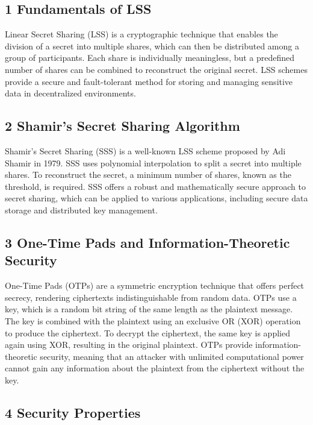 \documentclass[11pt]{article}
\begin{document}
\subsection{1 Fundamentals of LSS}

Linear Secret Sharing (LSS) is a cryptographic technique that enables the division of a secret into multiple shares, which can then be distributed among a group of participants. Each share is individually meaningless, but a predefined number of shares can be combined to reconstruct the original secret. LSS schemes provide a secure and fault-tolerant method for storing and managing sensitive data in decentralized environments.


\subsection{2 Shamir's Secret Sharing Algorithm}

Shamir's Secret Sharing (SSS) is a well-known LSS scheme proposed by Adi Shamir in 1979. SSS uses polynomial interpolation to split a secret into multiple shares. To reconstruct the secret, a minimum number of shares, known as the threshold, is required. SSS offers a robust and mathematically secure approach to secret sharing, which can be applied to various applications, including secure data storage and distributed key management.


\subsection{3 One-Time Pads and Information-Theoretic Security}

One-Time Pads (OTPs) are a symmetric encryption technique that offers perfect secrecy, rendering ciphertexts indistinguishable from random data. OTPs use a key, which is a random bit string of the same length as the plaintext message. The key is combined with the plaintext using an exclusive OR (XOR) operation to produce the ciphertext. To decrypt the ciphertext, the same key is applied again using XOR, resulting in the original plaintext. OTPs provide information-theoretic security, meaning that an attacker with unlimited computational power cannot gain any information about the plaintext from the ciphertext without the key.


\subsection{4 Security Properties}
\end{document}
